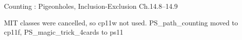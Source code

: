 \documentclass[handout]{mcs}
\begin{document}
\begin{staffnotes}
Counting : Pigeonholes, Inclusion-Exclusion Ch.14.8--14.9
\end{staffnotes}

\begin{staffnotes}
MIT classes were cancelled, so cp11w not used.  PS_path_counting moved
to cp11f, PS_magic_trick_4cards to ps11
\end{staffnotes}



\end{document}
